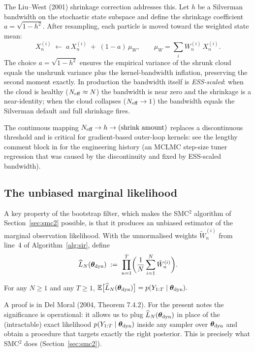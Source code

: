 The Liu--West (2001) shrinkage correction addresses this. Let $h$ be
a Silverman bandwidth on the stochastic state subspace and define the
shrinkage coefficient $a = \sqrt{1 - h^2}$. After resampling, each
particle is moved toward the weighted state mean:
\begin{equation}
X_n^{(i)} \;\leftarrow\; a\, X_n^{(i)} \;+\; (1 - a)\, \mu_W,
\qquad \mu_W = \sum_i W_n^{(i)}\, X_n^{(i)}.
\label{eq:liu-west}
\end{equation}
The choice $a = \sqrt{1 - h^2}$ ensures the empirical variance of the
shrunk cloud equals the unshrunk variance plus the kernel-bandwidth
inflation, preserving the second moment exactly. In production the
bandwidth itself is \emph{ESS-scaled}: when the cloud is healthy
($N_{\rm eff} \approx N$) the bandwidth is near zero and the
shrinkage is a near-identity; when the cloud collapses
($N_{\rm eff} \to 1$) the bandwidth equals the Silverman default and
full shrinkage fires.

The continuous mapping $N_{\rm eff} \to h \to (\text{shrink amount})$
replaces a discontinuous threshold and is critical for
gradient-based outer-loop kernels: see the lengthy comment block in
 for the engineering history
(an MCLMC step-size tuner regression that was caused by the
discontinuity and fixed by ESS-scaled bandwidth).

\subsection{The unbiased marginal likelihood} \label{sec:pf-likelihood}

A key property of the bootstrap filter, which makes the SMC$^2$
algorithm of Section~\ref{sec:smc2} possible, is that it produces an
unbiased estimator of the marginal observation likelihood. With the
unnormalised weights $\tilde W_n^{(i)}$ from line~4 of
Algorithm~\ref{alg:sir}, define
\begin{equation}
\widehat{L}_N(\bm{\theta}_{\rm dyn}) \;:=\; \prod_{n=1}^{T}
   \biggl(\frac{1}{N} \sum_{i=1}^{N} \tilde W_n^{(i)}\biggr).
\label{eq:unbiased-likelihood}
\end{equation}

\begin{proposition} \label{prop:unbiased}
For any $N \ge 1$ and any $T \ge 1$,
\(
\mathbb{E}\bigl[\widehat{L}_N(\bm{\theta}_{\rm dyn})\bigr] = p(Y_{1:T} \mid \bm{\theta}_{\rm dyn}).
\)
\end{proposition}

A proof is in Del Moral (2004, Theorem 7.4.2). For the present notes
the significance is operational: it allows us to plug
$\widehat{L}_N(\bm{\theta}_{\rm dyn})$ in place of the (intractable) exact likelihood
$p(Y_{1:T} \mid \bm{\theta}_{\rm dyn})$ inside any sampler over $\bm{\theta}_{\rm dyn}$ and
obtain a procedure that targets exactly the right posterior. This is
precisely what SMC$^2$ does (Section~\ref{sec:smc2}).

